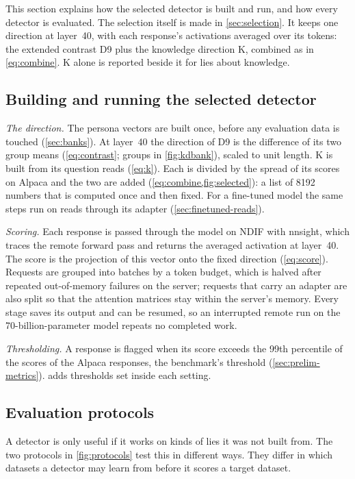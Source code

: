 This section explains how the selected detector is built and run, and how every detector is
evaluated. The selection itself is made in \cref{sec:selection}. It keeps one direction at
layer~40, with each response's activations averaged over its tokens: the extended contrast D9 plus
the knowledge direction K, combined as in \cref{eq:combine}. K alone is reported beside it for lies
about knowledge.

\subsection{Building and running the selected detector}
\label{sec:build-detector}

\emph{The direction.} The persona vectors are built once, before any evaluation data is touched
(\cref{sec:banks}). At layer~40 the direction of D9 is the difference of its two group means
(\cref{eq:contrast}; groups in \cref{fig:kdbank}), scaled to unit length. K is built from its
 question reads (\cref{eq:k}). Each is divided by the spread of its scores on Alpaca and
the two are added (\cref{eq:combine,fig:selected}): a list of 8192 numbers that is computed once and
then fixed.
For a fine-tuned model the same steps run on reads through its adapter (\cref{sec:finetuned-reads}).

\emph{Scoring.} Each response is passed through the model on NDIF with nnsight, which traces the
remote forward pass and returns the averaged activation at layer~40. The score is the projection of
this vector onto the fixed direction (\cref{eq:score}). Requests are grouped into batches by a token
budget, which is halved after repeated out-of-memory failures on the server; requests that carry an
adapter are also split so that the attention matrices stay within the server's memory. Every stage
saves its output and can be resumed, so an interrupted remote run on the 70-billion-parameter model
repeats no completed work.

\emph{Thresholding.} A response is flagged when its score exceeds the 99th percentile of the scores of
the  Alpaca responses, the benchmark's threshold (\cref{sec:prelim-metrics}).
 adds thresholds set inside each setting.

\subsection{Evaluation protocols}
\label{sec:protocols}

A detector is only useful if it works on kinds of lies it was not built from. The two protocols
in \cref{fig:protocols} test this in different ways. They differ in which datasets a detector may
learn from before it scores a target dataset.

